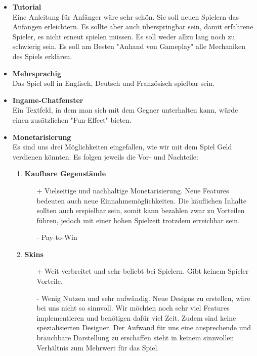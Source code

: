 \begin{itemize}
    \item \textbf{Tutorial} \\
        Eine Anleitung für Anfänger wäre sehr schön. Sie soll neuen Spielern das Anfangen erleichtern. Es sollte aber auch überspringbar sein,
        damit erfahrene Spieler, es nicht erneut spielen müssen. Es soll weder allzu lang noch zu schwierig sein. Es soll am Besten "Anhand von Gameplay" alle Mechaniken des Spiels
        erklären.
    \item \textbf{Mehrsprachig} \\
        Das Spiel soll in Englisch, Deutsch und Französisch spielbar sein.
    \item \textbf{Ingame-Chatfenster}\\
        Ein Textfeld, in dem man sich mit dem Gegner unterhalten kann, würde einen zusätzlichen "Fun-Effect" bieten.
    \item \textbf{Monetarisierung} \\
    Es sind uns drei Möglichkeiten eingefallen, wie wir mit dem Spiel Geld verdienen könnten. Es folgen jeweils die Vor- und Nachteile:
    \begin{enumerate}
        \item \textbf{Kaufbare Gegenstände}
        \begin{itemize}
            \item[+] Vielseitige und nachhaltige Monetarisierung. Neue Features bedeuten auch neue Einnahmemöglichkeiten. Die käuflichen Inhalte sollten
                        auch erspielbar sein, somit kann bezahlen zwar zu Vorteilen führen, jedoch mit einer hohen Spielzeit trotzdem erreichbar sein.
            \item[-] Pay-to-Win
        \end{itemize}
        \item \textbf{Skins}
        \begin{itemize}
            \item[+] Weit verbreitet und sehr beliebt bei Spielern. Gibt keinem Spieler Vorteile.
            \item[-] Wenig Nutzen und sehr aufwändig. Neue Designs zu erstellen, wäre bei uns nicht so sinnvoll.
                        Wir möchten noch sehr viel Features implementieren und benötigen dafür viel Zeit. Zudem sind keine spezialisierten Designer. Der Aufwand für uns eine ansprechende und brauchbare Darstellung zu erschaffen steht in keinem sinnvollen Verhältnis zum Mehrwert für das Spiel.
        \end{itemize}

\end{enumerate}
\end{itemize}
